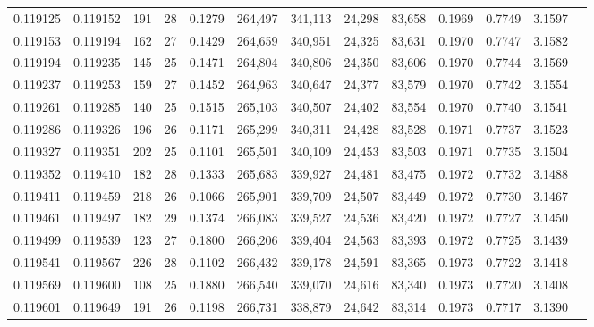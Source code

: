 \begin{tabular}{rrrrrrrrrrrrr}
0.119125 & 0.119152 & 191 &  28 &                                     0.1279 & 264,497 & 341,113 &  24,298 &  83,658 & 0.1969 & 0.7749 & 3.1597 \\
0.119153 & 0.119194 & 162 &  27 &                                     0.1429 & 264,659 & 340,951 &  24,325 &  83,631 & 0.1970 & 0.7747 & 3.1582 \\
0.119194 & 0.119235 & 145 &  25 &                                     0.1471 & 264,804 & 340,806 &  24,350 &  83,606 & 0.1970 & 0.7744 & 3.1569 \\
0.119237 & 0.119253 & 159 &  27 &                                     0.1452 & 264,963 & 340,647 &  24,377 &  83,579 & 0.1970 & 0.7742 & 3.1554 \\
0.119261 & 0.119285 & 140 &  25 &                                     0.1515 & 265,103 & 340,507 &  24,402 &  83,554 & 0.1970 & 0.7740 & 3.1541 \\
0.119286 & 0.119326 & 196 &  26 &                                     0.1171 & 265,299 & 340,311 &  24,428 &  83,528 & 0.1971 & 0.7737 & 3.1523 \\
0.119327 & 0.119351 & 202 &  25 &                                     0.1101 & 265,501 & 340,109 &  24,453 &  83,503 & 0.1971 & 0.7735 & 3.1504 \\
0.119352 & 0.119410 & 182 &  28 &                                     0.1333 & 265,683 & 339,927 &  24,481 &  83,475 & 0.1972 & 0.7732 & 3.1488 \\
0.119411 & 0.119459 & 218 &  26 &                                     0.1066 & 265,901 & 339,709 &  24,507 &  83,449 & 0.1972 & 0.7730 & 3.1467 \\
0.119461 & 0.119497 & 182 &  29 &                                     0.1374 & 266,083 & 339,527 &  24,536 &  83,420 & 0.1972 & 0.7727 & 3.1450 \\
0.119499 & 0.119539 & 123 &  27 &                                     0.1800 & 266,206 & 339,404 &  24,563 &  83,393 & 0.1972 & 0.7725 & 3.1439 \\
0.119541 & 0.119567 & 226 &  28 &                                     0.1102 & 266,432 & 339,178 &  24,591 &  83,365 & 0.1973 & 0.7722 & 3.1418 \\
0.119569 & 0.119600 & 108 &  25 &                                     0.1880 & 266,540 & 339,070 &  24,616 &  83,340 & 0.1973 & 0.7720 & 3.1408 \\
0.119601 & 0.119649 & 191 &  26 &                                     0.1198 & 266,731 & 338,879 &  24,642 &  83,314 & 0.1973 & 0.7717 & 3.1390 \\

\end{tabular}
